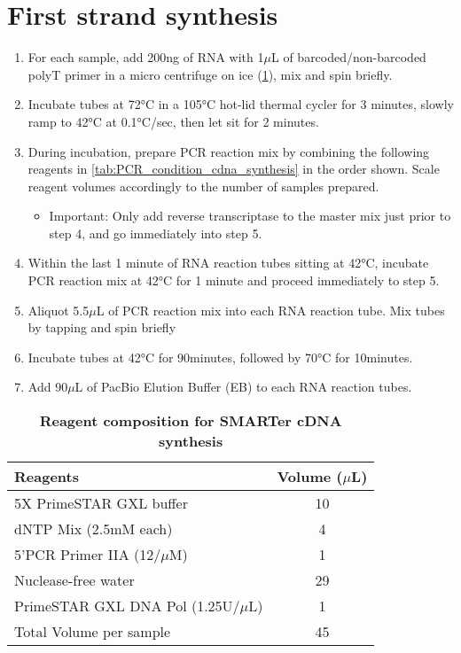 \section{First strand synthesis}
\label{Isoseq_protocol_cDNAsynthesis}
\begin{enumerate}
	\item For each sample, add 200ng of RNA with 1$\mu$L of barcoded/non-barcoded polyT primer in a micro centrifuge on ice (\cref{tab:cdna_synthesis}), mix and spin briefly.
	\item Incubate tubes at 72°C in a 105°C hot-lid thermal cycler for 3 minutes, slowly ramp to 42°C at 0.1°C/sec, then let sit for 2 minutes.
	\item During incubation, prepare PCR reaction mix by combining the following reagents in \cref{tab:PCR_condition_cdna_synthesis} in the order shown. Scale reagent volumes accordingly to the number of samples prepared.
	\begin{itemize}
		\item Important: Only add reverse transcriptase to the master mix just prior to step 4, and go immediately into step 5.
	\end{itemize}
	\item Within the last 1 minute of RNA reaction tubes sitting at 42°C, incubate PCR reaction mix at 42°C for 1 minute and proceed immediately to step 5.
	\item Aliquot 5.5$\mu$L of PCR reaction mix into each RNA reaction tube. Mix tubes by tapping and spin briefly 
	\item Incubate tubes at 42°C for 90minutes, followed by 70°C for 10minutes. 
	\item Add 90$\mu$L of PacBio Elution Buffer (EB) to each RNA reaction tubes.
\end{enumerate}

\vspace{1cm}
\begin{table}[h]
	\centering
	\caption[Reagent composition for SMARTer cDNA synthesis]%
	{\textbf{Reagent composition for SMARTer cDNA synthesis}}
	\label{tab:cdna_synthesis}
	\begin{tabularx}{0.8\textwidth}{lc}
		\toprule 
		Reagents                         & Volume ($\mu$L) \\ \midrule
		5X PrimeSTAR GXL buffer          & 10          \\ 
		dNTP Mix (2.5mM each)            & 4           \\ 
		5'PCR Primer IIA (12/$\mu$M)     & 1           \\ 
		Nuclease-free water              & 29          \\ 
		PrimeSTAR GXL DNA Pol (1.25U/$\mu$L) & 1       \\ 
		Total Volume per sample          & 45          \\ 
		\bottomrule	
	\end{tabularx}
\end{table}

